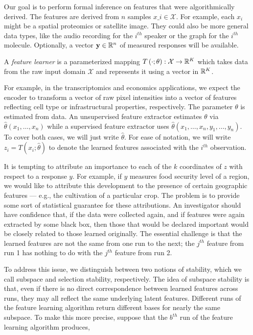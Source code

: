 Our goal is to perform formal inference on features that were algorithmically derived. The features are derived from $n$ samples $x\_i \in \mathcal{X}$. For example, each $x_{i}$ might be a spatial proteomics or satellite image. They could also be more general data types, like the audio recording for the $i^{th}$ speaker or the graph for the $i^{th}$ molecule. Optionally, a vector $\mathbf{y}\in \mathbb{R}^{n}$ of measured responses will be available.

\begin{definition}
A \textit{feature learner} is a parameterized mapping $T\left(\cdot;
\theta\right): \mathcal{X} \to \mathbb{R}^{K}$ which takes data from the raw input
domain $\mathcal{X}$ and represents it using a vector in $\mathbb{R}^{K}$.
\end{definition}

For example, in the transcriptomics and economics applications, we expect the encoder to transform a vector of raw pixel intensities into a vector of features reflecting cell type or infrastructural properties, respectively. The parameter $\theta$ is estimated from data. An unsupervised feature extractor estimates $\theta$ via $\hat{\theta}\left(x_{1}, \dots, x_{n}\right)$ while a supervised feature extractor uses $\hat{\theta}\left(x_{1}, \dots, x_{n}, y_{1}, \dots, y_{n}\right)$. To cover both cases, we will just write $\hat{\theta}$. For ease of notation, we will write $z_{i} = T\left(x_{i}; \hat{\theta}\right)$ to denote the learned features associated with the $i^{th}$ observation.

It is tempting to attribute an importance to each of the $k$ coordinates of $z$ with respect to a response $y$. For example, if $y$ measures food security level of a region, we would like to attribute this development to the presence of certain geographic features — e.g., the cultivation of a particular crop. The problem is to provide some sort of statistical guarantee for these attributions. An investigator should have confidence that, if the data were collected again, and if features were again extracted by some black box, then those that would be declared important would be closely related to those learned originally. The essential challenge is that the learned features are not the same from one run to the next; the $j^{th}$ feature from run 1 has nothing to do with the $j^{th}$ feature from run 2.

To address this issue, we distinguish between two notions of stability, which we call subspace and selection stability, respectively. The idea of subspace stability is that, even if there is no direct correspondence between learned features across runs, they may all reflect the same underlying latent features. Different runs of the feature learning algorithm return different bases for nearly the same subspace.
To make this more precise, suppose that the $b^{th}$ run of the feature learning algorithm produces,

